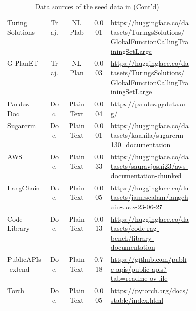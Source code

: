 \begin{table*}[ht]
\begin{tabular}{@{}lcccp{0.45\linewidth}@{}}
Turing Solutions & Traj. & NL Plab & 0.001 & \url{https://huggingface.co/datasets/TuringsSolutions/GlobalFunctionCallingTrainingSetLarge} \\
G-PlanET & Traj.  & NL Plan & 0.003 & \url{https://huggingface.co/datasets/TuringsSolutions/GlobalFunctionCallingTrainingSetLarge} \\
Pandas Doc & Doc. & Plain Text & 0.004 & \url{https://pandas.pydata.org/} \\
Sugarcrm & Doc. & Plain Text & 0.001 & \url{https://huggingface.co/datasets/kaahila/sugarcrm_130_documentation} \\
AWS & Doc. & Plain Text & 0.033 & \url{https://huggingface.co/datasets/sauravjoshi23/aws-documentation-chunked}  \\
LangChain & Doc. & Plain Text & 0.005 & \url{https://huggingface.co/datasets/jamescalam/langchain-docs-23-06-27} \\
Code Library & Doc. & Plain Text & 0.013 & \url{https://huggingface.co/datasets/code-rag-bench/library-documentation}\\
PublicAPIs-extend & Doc. & Plain Text & 0.718 & \url{https://github.com/public-apis/public-apis?tab=readme-ov-file} \\
Torch & Doc. & Plain Text & 0.005 & \url{https://pytorch.org/docs/stable/index.html} \\\bottomrule
\end{tabular}
\caption{Data sources of the seed data in \dataset (Cont'd). }
\label{tab:data-source2}
\end{table*}